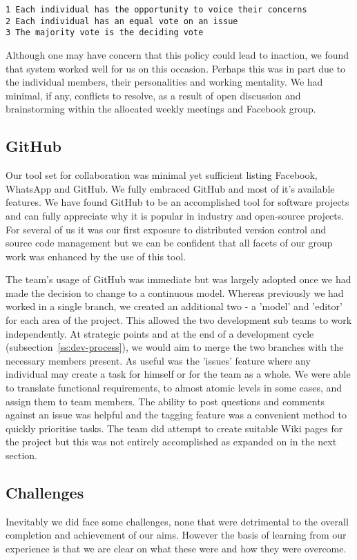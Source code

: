 \begin{lstlisting}[caption={Decision Making Agreement}]
1 Each individual has the opportunity to voice their concerns
2 Each individual has an equal vote on an issue
3 The majority vote is the deciding vote
\end{lstlisting}
 
Although one may have concern that this policy could lead to inaction, we found that system worked well for us on this occasion. Perhaps this was in part due to the individual members, their personalities and working mentality. We had minimal, if any, conflicts to resolve, as a result of open discussion and brainstorming within the allocated weekly meetings and Facebook group.

\subsection{GitHub}
Our tool set for collaboration was minimal yet sufficient listing Facebook, WhatsApp and GitHub. We fully embraced GitHub and most of it's available features. We have found GitHub to be an accomplished tool for software projects and can fully appreciate why it is popular in industry and open-source projects. For several of us it was our first exposure to distributed version control and source code management but we can be confident that all facets of our group work was enhanced by the use of this tool.

The team's usage of GitHub was immediate but was largely adopted once we had made the decision to change to a continuous model. Whereas previously we had worked in a single branch, we created an additional two - a 'model' and 'editor' for each area of the project.  This allowed the two development sub teams to work independently. At strategic points and at the end of a development cycle (subsection~\ref{ss:dev-process}), we would aim to merge the two branches with the necessary members present. As useful was the 'issues' feature where any individual may create a task for himself or for the team as a whole. We were able to translate functional requirements, to almost atomic levels in some cases, and assign them to team members. The ability to post questions and comments against an issue was helpful and the tagging feature was a convenient method to quickly prioritise tasks. The team  did attempt to create suitable Wiki pages for the project but this was not entirely accomplished as expanded on in the next section.

\subsection{Challenges}
Inevitably we did face some challenges, none that were detrimental to the overall completion and achievement of our aims. However the basis of learning from our experience is that we are clear on what these were and how they were overcome. 

